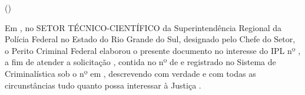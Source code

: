 \noindent\textbf{\MakeUppercase{\pfdocnamenum}}

\begin{center}
	\bigskip
	\textbf{\MakeUppercase{\pfdoctitle}}
	
	\ifx\pfdocsubtitle\empty
	\else
		(\MakeUppercase{\pfdocsubtitle})
	\fi
\end{center}

\bigskip

Em 
\pfdocdate,	no SETOR TÉCNICO-CIENTÍFICO da Superintendência
Regional da Polícia Federal no Estado do Rio Grande do Sul, designado pelo Chefe do Setor,	o Perito Criminal Federal 
\MakeUppercase{\pfauthor}\space elaborou o presente documento
no interesse do IPL nº
\pfipl,
a fim de atender a solicitação
\pfclient, contida no 
\pfexptype\space nº \pfexpnum\space de \pfexpdate\space	e registrado no Sistema de Criminalística sob o nº 
\pfregnum\space em \pfregdate, descrevendo com verdade e com todas as circunstâncias tudo quanto possa interessar à Justiça%
.

